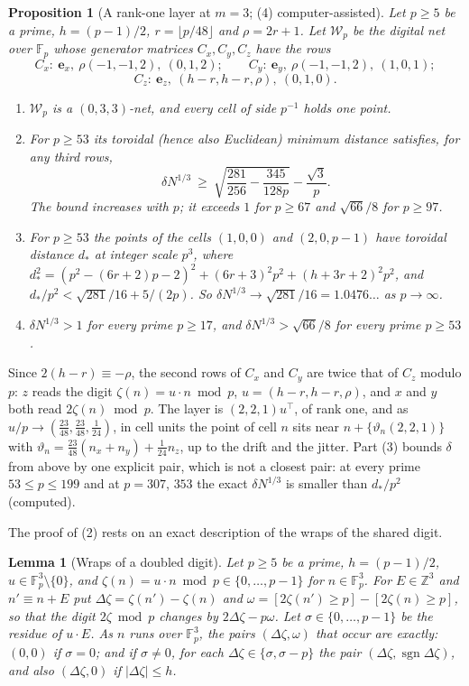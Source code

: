 \documentclass[11pt]{amsart}
\newtheorem{proposition}[theorem]{Proposition}
\newtheorem{lemma}[theorem]{Lemma}
\theoremstyle{definition}
\theoremstyle{plain}
\newcommand{\Z}{\mathbb{Z}}
\newcommand{\F}{\mathbb{F}}
\newcommand{\e}{\mathbf{e}}
\DeclareMathOperator{\sgn}{sgn}
\begin{document}
\begin{proposition}[A rank-one layer at $m=3$; (4) computer-assisted]\label{prop:wnet}
Let $p\ge5$ be a prime, $h=(p-1)/2$, $r=\lfloor p/48\rfloor$ and $\rho=2r+1$. Let $\mathcal W_p$ be the digital net over $\F_p$ whose generator matrices $C_x,C_y,C_z$ have the rows
\[
C_x:\ \e_x,\ \rho(-1,-1,2),\ (0,1,2);\qquad C_y:\ \e_y,\ \rho(-1,-1,2),\ (1,0,1);
\]
\[
C_z:\ \e_z,\ (h-r,h-r,\rho),\ (0,1,0).
\]
\begin{enumerate}
\item $\mathcal W_p$ is a $(0,3,3)$-net, and every cell of side $p^{-1}$ holds one point.
\item For $p\ge53$ its toroidal (hence also Euclidean) minimum distance satisfies, for any third rows,
\[
\delta N^{1/3}\ \ge\ \sqrt{\frac{281}{256}-\frac{345}{128p}}-\frac{\sqrt3}p .
\]
The bound increases with $p$; it exceeds $1$ for $p\ge67$ and $\sqrt{66}/8$ for $p\ge97$.
\item For $p\ge53$ the points of the cells $(1,0,0)$ and $(2,0,p-1)$ have toroidal distance $d_*$ at integer scale $p^3$, where $d_*^2=(p^2-(6r+2)p-2)^2+(6r+3)^2p^2+(h+3r+2)^2p^2$, and $d_*/p^2<\sqrt{281}/16+5/(2p)$. So $\delta N^{1/3}\to\sqrt{281}/16=1.0476\ldots$ as $p\to\infty$.
\item $\delta N^{1/3}>1$ for every prime $p\ge17$, and $\delta N^{1/3}>\sqrt{66}/8$ for every prime $p\ge53$.
\end{enumerate}
\end{proposition}

Since $2(h-r)\equiv-\rho$, the second rows of $C_x$ and $C_y$ are twice that of $C_z$ modulo $p$: $z$ reads the digit $\zeta(n)=u\cdot n\bmod p$, $u=(h-r,h-r,\rho)$, and $x$ and $y$ both read $2\zeta(n)\bmod p$. The layer is $(2,2,1)u^{\!\top}$, of rank one, and as $u/p\to(\frac{23}{48},\frac{23}{48},\frac1{24})$, in cell units the point of cell $n$ sits near $n+\{\vartheta_n(2,2,1)\}$ with $\vartheta_n=\frac{23}{48}(n_x+n_y)+\frac1{24}n_z$, up to the drift and the jitter. Part (3) bounds $\delta$ from above by one explicit pair, which is not a closest pair: at every prime $53\le p\le199$ and at $p=307$, $353$ the exact $\delta N^{1/3}$ is smaller than $d_*/p^2$ (computed).

The proof of (2) rests on an exact description of the wraps of the shared digit.

\begin{lemma}[Wraps of a doubled digit]\label{lem:wwrap}
Let $p\ge5$ be a prime, $h=(p-1)/2$, $u\in\F_p^3\setminus\{0\}$, and $\zeta(n)=u\cdot n\bmod p\in\{0,\dots,p-1\}$ for $n\in\F_p^3$. For $E\in\Z^3$ and $n'\equiv n+E$ put $\Delta\zeta=\zeta(n')-\zeta(n)$ and $\omega=[2\zeta(n')\ge p]-[2\zeta(n)\ge p]$, so that the digit $2\zeta\bmod p$ changes by $2\Delta\zeta-p\omega$. Let $\sigma\in\{0,\dots,p-1\}$ be the residue of $u\cdot E$. As $n$ runs over $\F_p^3$, the pairs $(\Delta\zeta,\omega)$ that occur are exactly: $(0,0)$ if $\sigma=0$; and if $\sigma\ne0$, for each $\Delta\zeta\in\{\sigma,\sigma-p\}$ the pair $(\Delta\zeta,\sgn\Delta\zeta)$, and also $(\Delta\zeta,0)$ if $|\Delta\zeta|\le h$.
\end{lemma}
\end{document}
